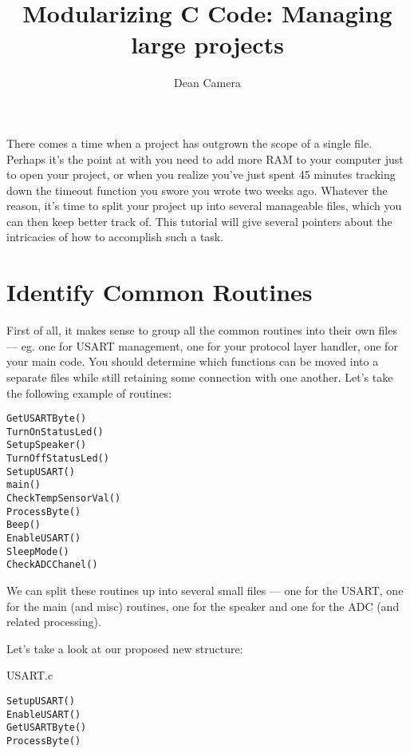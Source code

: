 \documentclass[a4paper,oneside]{book}
\begin{document}
\title{Modularizing C Code: Managing large projects}
\author{Dean Camera}
\maketitle



\cleardoublepage
\tableofcontents
\cleardoublepage


There comes a time when a project has outgrown the scope of a single file. Perhaps it's the point at with you need to add more RAM to your computer just to open your project, or when you realize you've just spent 45 minutes tracking down the timeout function you swore you wrote two weeks ago. Whatever the reason, it's time to split your project up into several manageable files, which you can then keep better track of. This tutorial will give several pointers about the intricacies of how to accomplish such a task.

\section{Identify Common Routines}

First of all, it makes sense to group all the common routines into their own files --- eg. one for USART management, one for your protocol layer handler, one for your main code. You should determine which functions can be moved into a separate files while still retaining some connection with one another. Let's take the following example of routines:

\begin{center}
\begin{lstlisting}
GetUSARTByte()
TurnOnStatusLed()
SetupSpeaker()
TurnOffStatusLed()
SetupUSART()
main()
CheckTempSensorVal()
ProcessByte()
Beep()
EnableUSART()
SleepMode()
CheckADCChanel()
\end{lstlisting}
\end{center}

We can split these routines up into several small files --- one for the USART, one for the main (and misc) routines, one for the speaker and one for the ADC (and related processing).

Let's take a look at our proposed new structure:

USART.c
\begin{center}
\begin{lstlisting}
SetupUSART()
EnableUSART()
GetUSARTByte()
ProcessByte()
\end{lstlisting}
\end{center}
\end{document}
